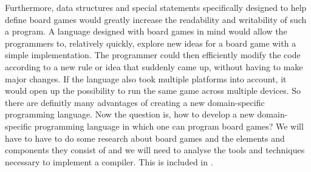 Furthermore, data structures and special statements specifically designed to help define board games would greatly increase the readability and writability of such a program. A language designed with board games in mind would allow the programmers to, relatively quickly, explore new ideas for a board game with a simple implementation. The programmer could then efficiently modify the code according to a new rule or idea that suddenly came up, without having to make major changes. If the language also took multiple platforms into account, it would open up the possibility to run the same game across multiple devices. So there are definitly many advantages of creating a new domain-specific programming language. Now the question is, how to develop a new domain-specific programming language in which one can program board games? We will have to have to do some research about board games and the elements and components they consist of and we will need to analyse the tools and techniques necessary to implement a compiler. This is included in .

%
%
